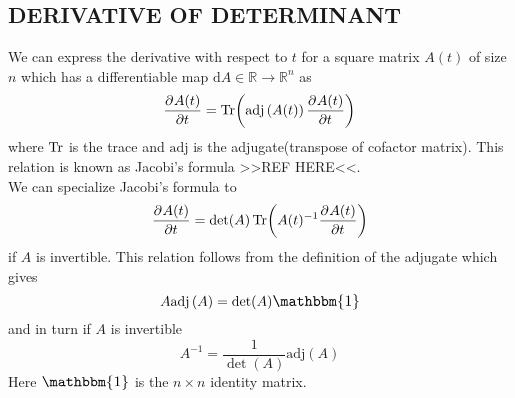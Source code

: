 \documentclass[a4paper, hidelinks, 10pt]{article}
\let\oldsubsection\subsection
\renewcommand{\subsection}[1]{\centering \oldsubsection{{#1}} \justifying}
\newcommand{\md}{\mathrm{d}} %
\newcommand{\rarr}{\rightarrow} %
\newcommand{\I}{\scalebox{1.1}{$\mathbbm{1}$}}
\begin{document}
\subsection{DERIVATIVE OF DETERMINANT}
\label{sub:derivative_of_determinant}
    We can express the derivative with respect to $t$ for a square matrix
    $A(t)$ of size $n$ which has a differentiable map $\md
    A\in\mathbb{R}\rarr\mathbb{R}^n$ as
        \begin{equation}
            \prd{t}[A(t)] = \Tr(\text{adj}\left(A(t)\right)\prd{t}[A(t)])
            \label{eq:JacobisDef}
        \end{equation}
    where $\Tr$ is the trace and $\text{adj}$ is the adjugate(transpose of
    cofactor matrix). This relation is known as Jacobi's formula >>REF HERE<<.
    \\
    We can specialize Jacobi's formula to
        \begin{equation}
            \prd{t}[A(t)] = \det(A)\Tr(A(t)^{-1}\prd{t}[A(t)])
            \label{eq:jacobiSpecial}
        \end{equation}
    if $A$ is invertible. This relation follows from the definition of the
    adjugate which gives
        \begin{equation}
            A\text{adj}\left(A\right) = \det(A)\I
            \label{eq:aadja}
        \end{equation}
    and in turn if $A$ is invertible
        \begin{equation}
            A^{-1} = \frac{1}{\det(A)}\text{adj}\left(A\right)
            \label{eq:aadjainv}
        \end{equation}
    Here $\I$ is the $n\times n$ identity matrix.
\end{document}
